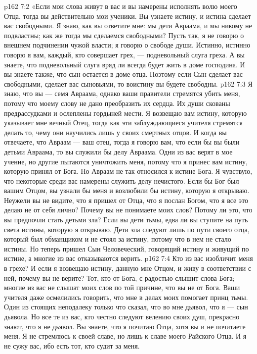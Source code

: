 \vs p162 7:2 \pc «Если мои слова живут в вас и вы намерены исполнять волю моего Отца, тогда вы действительно мои ученики. Вы узнаете истину, и истина сделает вас свободными. Я знаю, как вы ответите мне: мы дети Авраама, и мы никому не подвластны; как же тогда мы сделаемся свободными? Пусть так, я не говорю о внешнем подчинении чужой власти; я говорю о свободе души. Истинно, истинно говорю я вам, каждый, кто совершает грех, --- подневольный слуга греха. А вы знаете, что подневольный слуга вряд ли всегда будет жить в доме господина. И вы знаете также, что сын остается в доме отца. Поэтому если Сын сделает вас свободными, сделает вас сыновьями, то воистину вы будете свободны.
\vs p162 7:3 Я знаю, что вы --- семя Авраама, однако ваши правители стремятся убить меня, потому что моему слову не дано преобразить их сердца. Их души скованы предрассудками и ослеплены гордыней мести. Я возвещаю вам истину, которую указывает мне вечный Отец, тогда как эти заблуждающиеся учителя стремятся делать то, чему они научились лишь у своих смертных отцов. И когда вы отвечаете, что Авраам --- ваш отец, тогда я говорю вам, что если бы вы были детьми Авраама, то вы служили бы делу Авраама. Одни из вас верят в мое учение, но другие пытаются уничтожить меня, потому что я принес вам истину, которую принял от Бога. Но Авраам не так относился к истине Бога. Я чувствую, что некоторые среди вас намерены служить делу нечистого. Если бы Бог был вашим Отцом, вы узнали бы меня и возлюбили бы истину, которую я открываю. Неужели вы не видите, что я пришел от Отца, что я послан Богом, что я все это делаю не от себя лично? Почему вы не понимаете моих слов? Потому ли это, что вы предпочли стать детьми зла? Если вы дети тьмы, едва ли вы ступите на путь света истины, которую я открываю. Дети зла следуют лишь по пути своего отца, который был обманщиком и не стоял за истину, потому что в нем не стало истины. Но теперь пришел Сын Человеческий, говорящий истину и живущий по истине, а многие из вас отказываются верить.
\vs p162 7:4 Кто из вас изобличит меня в грехе? И если я возвещаю истину, данную мне Отцом, и живу в соответствии с ней, почему вы не верите? Тот, кто от Бога, с радостью слышит слова Бога; многие из вас не слышат моих слов по той причине, что вы не от Бога. Ваши учителя даже осмелились говорить, что мне в делах моих помогает принц тьмы. Один из стоящих неподалеку только что сказал, что во мне дьявол, что я --- сын дьявола. Но все те из вас, кто честно следуют велению своих душ, прекрасно знают, что я не дьявол. Вы знаете, что я почитаю Отца, хотя вы и не почитаете меня. Я не стремлюсь к своей славе, но лишь к славе моего Райского Отца. И я не сужу вас, ибо есть тот, кто судит за меня.

